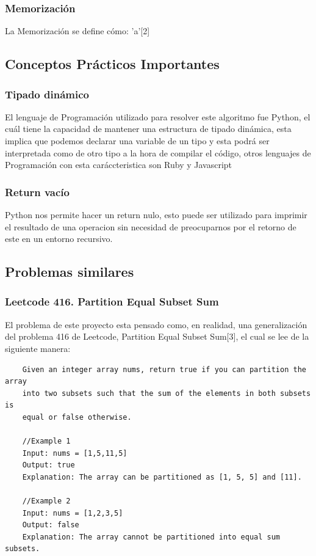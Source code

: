 \documentclass[a4paper]{article}
\begin{document}
\subsubsection{Memorización}
La Memorización se define cómo: 'a'[2]

\subsection{Conceptos Prácticos Importantes}
\subsubsection{Tipado dinámico}
El lenguaje de Programación utilizado para resolver este algoritmo fue Python,
el cuál tiene la capacidad de mantener una estructura de tipado dinámica, esta
implica que podemos declarar una variable de un tipo y esta podrá ser interpretada
como de otro tipo a la hora de compilar el código, otros lenguajes de Programación
con esta caráccteristica son Ruby y Javascript

\subsubsection{Return vacío}
Python nos permite hacer un return nulo, esto puede ser utilizado para imprimir el
resultado de una operacion sin necesidad de preocuparnos por el retorno de este en un
entorno recursivo.

\subsection{Problemas similares}
\subsubsection{Leetcode 416. Partition Equal Subset Sum}
El problema de este proyecto esta pensado como, en realidad, una generalización
del problema 416 de Leetcode, Partition Equal Subset Sum[3], el cual se lee de la siguiente manera:

\begin{verbatim}
    Given an integer array nums, return true if you can partition the array
    into two subsets such that the sum of the elements in both subsets is 
    equal or false otherwise.

    //Example 1
    Input: nums = [1,5,11,5]
    Output: true
    Explanation: The array can be partitioned as [1, 5, 5] and [11].

    //Example 2
    Input: nums = [1,2,3,5]
    Output: false
    Explanation: The array cannot be partitioned into equal sum subsets.
\end{verbatim} 
\end{document}
